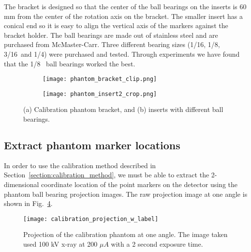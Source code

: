The bracket is designed so that the center of the ball bearings on the inserts is 60 mm from the center of the rotation axis on the bracket.  The smaller insert has a conical end so it is easy to align the vertical axis of the markers against the bracket holder.  The ball bearings are made out of stainless steel and are purchased from McMaster-Carr.  Three different bearing sizes (1/16\inches, 1/8\inches,~ 3/16\inches ~and 1/4\inches) were purchased and tested.  Through experiments we have found that the 1/8\inches~ ball bearings worked the best.
%
\begin{figure}[ht]
	\begin{subfigure}[b]{0.3\linewidth}
	\texttt{[image: phantom\_bracket\_clip.png]}
	\label{fig:calibration_phantom_bracket}
	\caption{}
	\end{subfigure}
\hspace{0.2cm}
	\begin{subfigure}[b]{0.3\linewidth}
	\texttt{[image: phantom\_insert2\_crop.png]}
	\label{fig:calibration_phantom_insert}
	\caption{}
	\end{subfigure}
\caption{(a) Calibration phantom bracket, and (b) inserts with different ball bearings.}
\label{fig:calibration_phantom}
\end{figure}

\subsection{Extract phantom marker locations}
In order to use the calibration method described in Section~\ref{section:calibration_method}, we must be able to extract the 2-dimensional coordinate location of the point markers on the detector using the phantom ball bearing projection images.  The raw projection image at one angle is shown in Fig.~\ref{fig:calibration_projection}.

\begin{figure}[ht]
\centering
\texttt{[image: calibration\_projection\_w\_label]}
\caption{Projection of the calibration phantom at one angle.  The image taken used 100 kV x-ray at 200 $\mu A$ with a 2 second exposure time.}
\label{fig:calibration_projection}
\end{figure}

